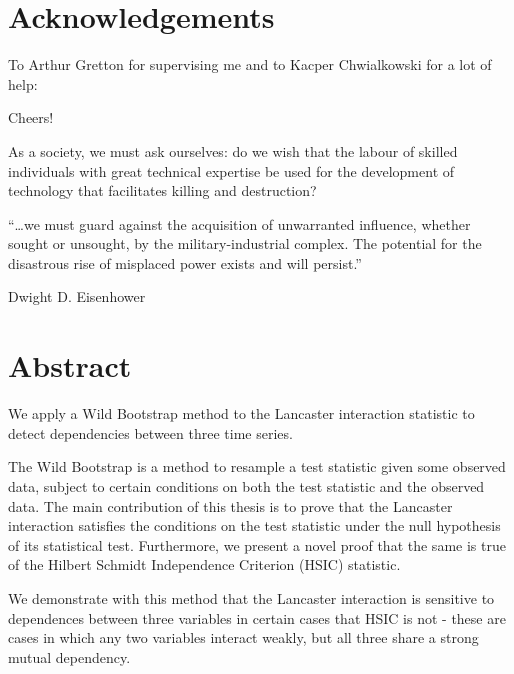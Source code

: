 \documentclass[12pt]{article}
\numberwithin{claim}{section}
\numberwithin{lemma}{section}
\numberwithin{theorem}{section}
\begin{document}
\section*{Acknowledgements}
\vspace{1cm}
To Arthur Gretton for supervising me and to Kacper Chwialkowski for a lot of help:

\vspace{1cm}

\begin{center}
Cheers!
\end{center}

\newpage
\mbox{}
\newpage
\mbox{}
\newpage
\mbox{}
\newpage

As a society, we must ask ourselves: do we wish that the labour of skilled individuals with great technical expertise be used for the development of technology that facilitates killing and destruction? 

\vspace{2cm}

``\ldots we must guard against the acquisition of unwarranted influence, whether sought or unsought, by the military-industrial complex. The potential for the disastrous rise of misplaced power exists and will persist.''
\begin{flushright}
Dwight D. Eisenhower
\end{flushright}

\newpage
\mbox{}
\newpage
\mbox{}
\newpage
\mbox{}
\newpage
\section*{Abstract}
We apply a Wild Bootstrap method to the Lancaster interaction statistic to detect dependencies between three time series. 

The Wild Bootstrap is a method to resample a test statistic given some observed data, subject to certain conditions on both the test statistic and the observed data. The main contribution of this thesis is to prove that the Lancaster interaction satisfies the conditions on the test statistic under the null hypothesis of its statistical test. Furthermore, we present a novel proof that the same is true of the Hilbert Schmidt Independence Criterion (HSIC) statistic.

We demonstrate with this method that the Lancaster interaction is sensitive to dependences between three variables in certain cases that HSIC is not - these are cases in which any two variables interact weakly, but all three share a strong mutual dependency.
\end{document}
